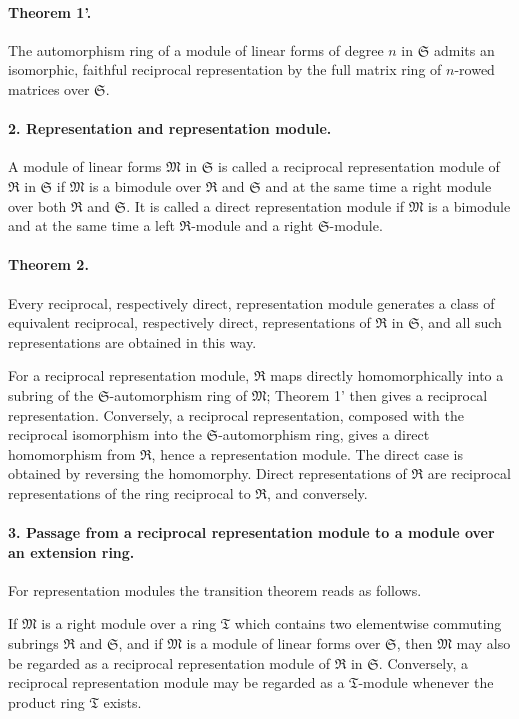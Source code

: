 \documentclass[11pt]{article}
\providecommand{\frR}{\mathfrak R}
\providecommand{\frS}{\mathfrak S}
\providecommand{\frT}{\mathfrak T}
\providecommand{\frM}{\mathfrak M}
\begin{document}
\paragraph{Theorem 1'.}
The automorphism ring of a module of linear forms of degree \(n\) in \(\frS\) admits an isomorphic, faithful reciprocal representation by the full matrix ring of \(n\)-rowed matrices over \(\frS\).

\paragraph{2. Representation and representation module.}
A module of linear forms \(\frM\) in \(\frS\) is called a reciprocal representation module of \(\frR\) in \(\frS\) if \(\frM\) is a bimodule over \(\frR\) and \(\frS\) and at the same time a right module over both \(\frR\) and \(\frS\). It is called a direct representation module if \(\frM\) is a bimodule and at the same time a left \(\frR\)-module and a right \(\frS\)-module.

\paragraph{Theorem 2.}
Every reciprocal, respectively direct, representation module generates a class of equivalent reciprocal, respectively direct, representations of \(\frR\) in \(\frS\), and all such representations are obtained in this way.

For a reciprocal representation module, \(\frR\) maps directly homomorphically into a subring of the \(\frS\)-automorphism ring of \(\frM\); Theorem 1' then gives a reciprocal representation. Conversely, a reciprocal representation, composed with the reciprocal isomorphism into the \(\frS\)-automorphism ring, gives a direct homomorphism from \(\frR\), hence a representation module. The direct case is obtained by reversing the homomorphy. Direct representations of \(\frR\) are reciprocal representations of the ring reciprocal to \(\frR\), and conversely.

\paragraph{3. Passage from a reciprocal representation module to a module over an extension ring.}
For representation modules the transition theorem reads as follows.

If \(\frM\) is a right module over a ring \(\frT\) which contains two elementwise commuting subrings \(\frR\) and \(\frS\), and if \(\frM\) is a module of linear forms over \(\frS\), then \(\frM\) may also be regarded as a reciprocal representation module of \(\frR\) in \(\frS\). Conversely, a reciprocal representation module may be regarded as a \(\frT\)-module whenever the product ring \(\frT\) exists.
\end{document}
